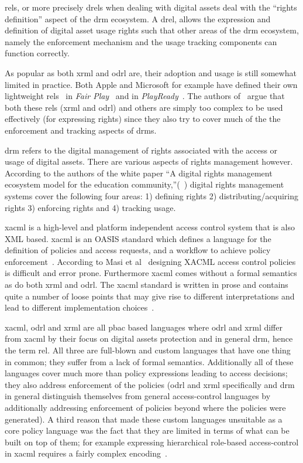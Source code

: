 \ac{rel}s, or more precisely \ac{drel}s when dealing with digital assets deal with the ``rights definition'' aspect of the \ac{drm} ecosystem. A \ac{drel}, allows the expression and definition of digital asset usage rights such that other areas of the \ac{drm} ecosystem, namely the enforcement mechanism and the usage tracking components can function correctly.

As popular as both \ac{xrml} and \ac{odrl} are, their adoption and usage is still somewhat limited in practice. Both Apple and Microsoft for example have defined their own lightweight \ac{rel}s~\cite{problemwithrels} in \emph{Fair Play}~\cite{fairplay} and in \emph{PlayReady}~\cite{playready}. The authors of~\cite{problemwithrels} argue that both these \ac{rel}s (\ac{xrml} and \ac{odrl}) and others are simply too complex to be used effectively (for expressing rights) since they also try to cover much of the the enforcement and tracking aspects of \ac{drm}s.

\ac{drm} refers to the digital management of rights associated with the access or usage of digital assets. There are various aspects of rights management however. According to the authors of the white paper ``A digital rights management ecosystem model for the education community,''(~\cite{collier})
 digital rights management systems cover the following four areas: 1) defining rights 2) distributing/acquiring rights 3) enforcing rights and 4) tracking usage.

\ac{xacml} is a high-level and platform independent access control system that is also XML based.  \ac{xacml} is an OASIS standard which defines a language for the definition of policies and access requests, and a workflow to achieve policy enforcement~\cite{DBLP:conf/essos/MasiPT12}. According to Masi et al~\cite{DBLP:conf/essos/MasiPT12} designing XACML access control policies is difficult and error prone. Furthermore \ac{xacml} comes without a formal semantics as do both \ac{xrml} and \ac{odrl}. The \ac{xacml} standard is written in prose and contains quite a number of loose points that may give rise to different interpretations and lead to different implementation choices~\cite{DBLP:conf/essos/MasiPT12}.

\ac{xacml}, \ac{odrl} and \ac{xrml} are all \ac{pbac} based languages where \ac{odrl} and \ac{xrml} differ from \ac{xacml} by their focus on digital assets protection and in general \ac{drm}, hence the term \ac{rel}. All three are full-blown and custom languages that have one thing in common; they suffer from a lack of formal semantics. Additionally all of these languages cover much more than policy expressions leading to access decisions; they also address enforcement of the policies (\ac{odrl} and \ac{xrml} specifically and \ac{drm} in general distinguish themselves from general access-control languages by additionally addressing enforcement of policies beyond where the policies were generated). A third reason that made these custom languages unsuitable as a core policy language was the fact that they are limited in terms of what can be built on top of them; for example expressing hierarchical role-based access-control  in \ac{xacml} requires a fairly complex encoding~\cite{Tschantz}.

